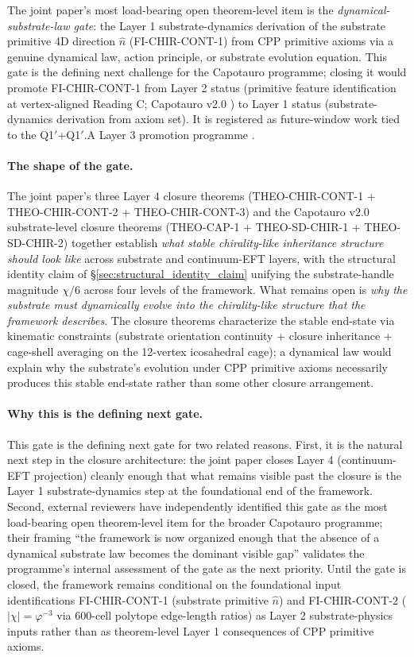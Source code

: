 \documentclass[11pt,letterpaper]{article}
\begin{document}
The joint paper's most load-bearing open theorem-level item is the \emph{dynamical-substrate-law gate}: the Layer 1 substrate-dynamics derivation of the substrate primitive 4D direction $\hat{n}$ (FI-CHIR-CONT-1) from CPP primitive axioms via a genuine dynamical law, action principle, or substrate evolution equation. This gate is the defining next challenge for the Capotauro programme; closing it would promote FI-CHIR-CONT-1 from Layer 2 status (primitive feature identification at vertex-aligned Reading C; Capotauro v2.0 \cite{Capotauro}) to Layer 1 status (substrate-dynamics derivation from axiom set). It is registered as future-window work tied to the Q1$'$+Q1$'$.A Layer 3 promotion programme \cite{ReviewerNotes}.

\paragraph{The shape of the gate.}
The joint paper's three Layer 4 closure theorems (THEO-CHIR-CONT-1 + THEO-CHIR-CONT-2 + THEO-CHIR-CONT-3) and the Capotauro v2.0 substrate-level closure theorems (THEO-CAP-1 + THEO-SD-CHIR-1 + THEO-SD-CHIR-2) together establish \emph{what stable chirality-like inheritance structure should look like} across substrate and continuum-EFT layers, with the structural identity claim of §\ref{sec:structural_identity_claim} unifying the substrate-handle magnitude $\chi/6$ across four levels of the framework. What remains open is \emph{why the substrate must dynamically evolve into the chirality-like structure that the framework describes}. The closure theorems characterize the stable end-state via kinematic constraints (substrate orientation continuity + closure inheritance + cage-shell averaging on the 12-vertex icosahedral cage); a dynamical law would explain why the substrate's evolution under CPP primitive axioms necessarily produces this stable end-state rather than some other closure arrangement.

\paragraph{Why this is the defining next gate.}
This gate is the defining next gate for two related reasons. First, it is the natural next step in the closure architecture: the joint paper closes Layer 4 (continuum-EFT projection) cleanly enough that what remains visible past the closure is the Layer 1 substrate-dynamics step at the foundational end of the framework. Second, external reviewers \cite{ReviewerNotes} have independently identified this gate as the most load-bearing open theorem-level item for the broader Capotauro programme; their framing ``the framework is now organized enough that the absence of a dynamical substrate law becomes the dominant visible gap'' validates the programme's internal assessment of the gate as the next priority. Until the gate is closed, the framework remains conditional on the foundational input identifications FI-CHIR-CONT-1 (substrate primitive $\hat{n}$) and FI-CHIR-CONT-2 ($|\chi| = \varphi^{-3}$ via 600-cell polytope edge-length ratios) as Layer 2 substrate-physics inputs rather than as theorem-level Layer 1 consequences of CPP primitive axioms.
\end{document}
